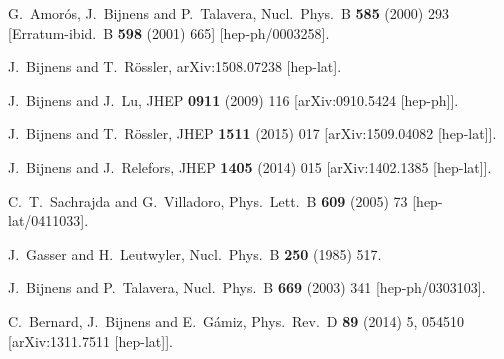 \documentclass[12pt,a4paper]{article}
\begin{document}
\begin{thebibliography}{99}
  G.~Amor\'os, J.~Bijnens and P.~Talavera,
  Nucl.\ Phys.\ B {\bf 585} (2000) 293
   [Erratum-ibid.\ B {\bf 598} (2001) 665]
  [hep-ph/0003258].

  J.~Bijnens and T.~Rössler,
  arXiv:1508.07238 [hep-lat].

  J.~Bijnens and J.~Lu,
  JHEP {\bf 0911} (2009) 116
  [arXiv:0910.5424 [hep-ph]].

  J.~Bijnens and T.~Rössler,
  JHEP {\bf 1511} (2015) 017
  [arXiv:1509.04082 [hep-lat]].

  J.~Bijnens and J.~Relefors,
  JHEP {\bf 1405} (2014) 015
  [arXiv:1402.1385 [hep-lat]].

  C.~T.~Sachrajda and G.~Villadoro,
  Phys.\ Lett.\ B {\bf 609} (2005) 73
  [hep-lat/0411033].

  J.~Gasser and H.~Leutwyler,
  Nucl.\ Phys.\ B {\bf 250} (1985) 517.

  J.~Bijnens and P.~Talavera,
  Nucl.\ Phys.\ B {\bf 669} (2003) 341
  [hep-ph/0303103].

  C.~Bernard, J.~Bijnens and E.~Gámiz,
  Phys.\ Rev.\ D {\bf 89} (2014) 5,  054510
  [arXiv:1311.7511 [hep-lat]].


\end{thebibliography}
\end{document}
